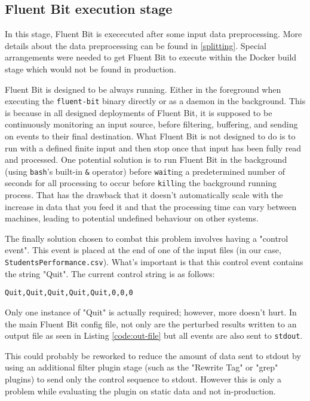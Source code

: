 \subsection{Fluent Bit execution stage}
In this stage, Fluent Bit is exececuted after some input data preprocessing. More details about the data preprocessing can be found in \ref{splitting}. Special arrangements were needed to get Fluent Bit to execute within the Docker build stage which would not be found in production.

Fluent Bit is designed to be always running. Either in the foreground when executing the \texttt{fluent-bit} binary directly or as a \Gls{daemon} in the background. This is because in all designed deployments of Fluent Bit, it is supposed to be continuously monitoring an input source, before filtering, buffering, and sending on \glspl{event} to their final destination. What Fluent Bit is not designed to do is to run with a defined finite input and then stop once that input has been fully read and processed. One potential solution is to run Fluent Bit in the background (using \texttt{bash}'s built-in \texttt{\&} operator) before \texttt{wait}ing a predetermined number of seconds for all processing to occur before \texttt{kill}ing the background running process. That has the drawback that it doesn't automatically scale with the increase in data that you feed it and that the processing time can vary between machines, leading to potential undefined behaviour on other systems. 

The finally solution chosen to combat this problem involves having a "control event". This event is placed at the end of one of the input files (in our case, \texttt{StudentsPerformance.csv}). What's important is that this control event contains the string "Quit". The current control string is as follows:

\begin{lstlisting}[caption={Quit Control code line}]
Quit,Quit,Quit,Quit,Quit,0,0,0
\end{lstlisting}

Only one instance of "Quit" is actually required; however, more doesn't hurt. In the main Fluent Bit config file, not only are the perturbed results written to an output file as seen in Listing \ref{code:out-file} but all events are also sent to \texttt{stdout}.

This could probably be reworked to reduce the amount of data sent to stdout by using an additional filter plugin stage (such as the "Rewrite Tag" or "grep" plugins) to send only the control sequence to stdout. However this is only a problem while evaluating the plugin on static data and not in-production.

